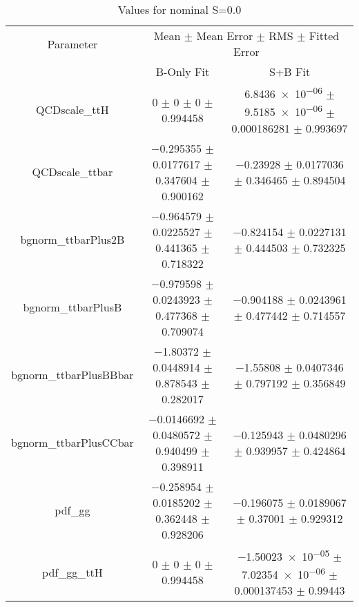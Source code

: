 \begin{table}
\centering
\caption{Values for nominal S=0.0}
\begin{tabular}{ccc}
\toprule
Parameter & \multicolumn{2}{c}{Mean $\pm$ Mean Error $\pm$ RMS $\pm$ Fitted Error}\\
 & B-Only Fit & S+B Fit\\
\midrule
QCDscale\_ttH & \num{0} $\pm$ \num{0} $\pm$ \num{0} $\pm$ \num{0.994458} & \num{6.8436e-06} $\pm$ \num{9.5185e-06} $\pm$ \num{0.000186281} $\pm$ \num{0.993697}\\
QCDscale\_ttbar & \num{-0.295355} $\pm$ \num{0.0177617} $\pm$ \num{0.347604} $\pm$ \num{0.900162} & \num{-0.23928} $\pm$ \num{0.0177036} $\pm$ \num{0.346465} $\pm$ \num{0.894504}\\
bgnorm\_ttbarPlus2B & \num{-0.964579} $\pm$ \num{0.0225527} $\pm$ \num{0.441365} $\pm$ \num{0.718322} & \num{-0.824154} $\pm$ \num{0.0227131} $\pm$ \num{0.444503} $\pm$ \num{0.732325}\\
bgnorm\_ttbarPlusB & \num{-0.979598} $\pm$ \num{0.0243923} $\pm$ \num{0.477368} $\pm$ \num{0.709074} & \num{-0.904188} $\pm$ \num{0.0243961} $\pm$ \num{0.477442} $\pm$ \num{0.714557}\\
bgnorm\_ttbarPlusBBbar & \num{-1.80372} $\pm$ \num{0.0448914} $\pm$ \num{0.878543} $\pm$ \num{0.282017} & \num{-1.55808} $\pm$ \num{0.0407346} $\pm$ \num{0.797192} $\pm$ \num{0.356849}\\
bgnorm\_ttbarPlusCCbar & \num{-0.0146692} $\pm$ \num{0.0480572} $\pm$ \num{0.940499} $\pm$ \num{0.398911} & \num{-0.125943} $\pm$ \num{0.0480296} $\pm$ \num{0.939957} $\pm$ \num{0.424864}\\
pdf\_gg & \num{-0.258954} $\pm$ \num{0.0185202} $\pm$ \num{0.362448} $\pm$ \num{0.928206} & \num{-0.196075} $\pm$ \num{0.0189067} $\pm$ \num{0.37001} $\pm$ \num{0.929312}\\
pdf\_gg\_ttH & \num{0} $\pm$ \num{0} $\pm$ \num{0} $\pm$ \num{0.994458} & \num{-1.50023e-05} $\pm$ \num{7.02354e-06} $\pm$ \num{0.000137453} $\pm$ \num{0.99443}\\
\bottomrule
\end{tabular}
\end{table}
